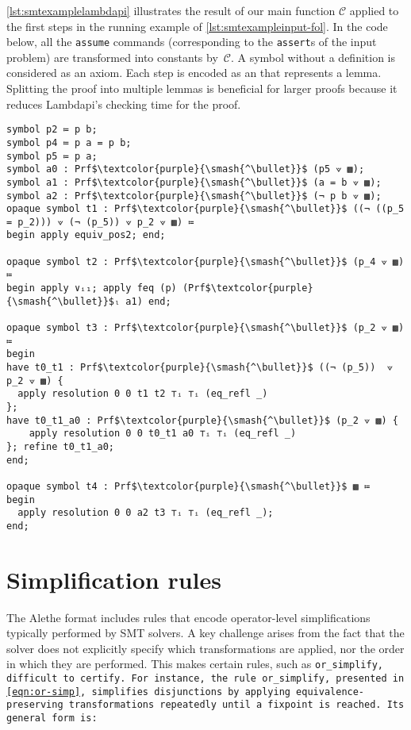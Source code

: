 \begin{example}
  \cref{lst:smtexamplelambdapi} illustrates the result of our main function $\mathcal{C}$ applied to the first steps in the running example of \cref{lst:smtexampleinput-fol}.
  In the code below, all the \texttt{assume} commands (corresponding to the \texttt{assert}s of the input problem) are transformed into constants by~$\mathcal{C}$. A symbol without a definition is considered as an axiom.
  Each step is encoded as an  that represents a lemma. Splitting the proof into multiple lemmas is beneficial for larger proofs because it reduces Lambdapi's checking time for the proof.
\end{example}

\begin{lstlisting}[mathescape=true, caption={Trace from \cref{lst:smtexampleinput} encoded in Lambdapi.}, label={lst:smtexamplelambdapi}, language=Lambdapi]
symbol p2 ≔ p b;
symbol p4 ≔ p a = p b;
symbol p5 ≔ p a;
symbol a0 : Prf$\textcolor{purple}{\smash{^\bullet}}$ (p5 ⟇ ▩);
symbol a1 : Prf$\textcolor{purple}{\smash{^\bullet}}$ (a = b ⟇ ▩);
symbol a2 : Prf$\textcolor{purple}{\smash{^\bullet}}$ (¬ p b ⟇ ▩);
opaque symbol t1 : Prf$\textcolor{purple}{\smash{^\bullet}}$ ((¬ ((p_5 = p_2))) ⟇ (¬ (p_5)) ⟇ p_2 ⟇ ▩) ≔
begin apply equiv_pos2; end;

opaque symbol t2 : Prf$\textcolor{purple}{\smash{^\bullet}}$ (p_4 ⟇ ▩) ≔
begin apply ∨ᵢ₁; apply feq (p) (Prf$\textcolor{purple}{\smash{^\bullet}}$ₗ a1) end;

opaque symbol t3 : Prf$\textcolor{purple}{\smash{^\bullet}}$ (p_2 ⟇ ▩) ≔
begin
have t0_t1 : Prf$\textcolor{purple}{\smash{^\bullet}}$ ((¬ (p_5))  ⟇ p_2 ⟇ ▩) {
  apply resolution 0 0 t1 t2 ⊤ᵢ ⊤ᵢ (eq_refl _)
};
have t0_t1_a0 : Prf$\textcolor{purple}{\smash{^\bullet}}$ (p_2 ⟇ ▩) {
    apply resolution 0 0 t0_t1 a0 ⊤ᵢ ⊤ᵢ (eq_refl _)
}; refine t0_t1_a0;
end;

opaque symbol t4 : Prf$\textcolor{purple}{\smash{^\bullet}}$ ▩ ≔
begin
  apply resolution 0 0 a2 t3 ⊤ᵢ ⊤ᵢ (eq_refl _);
end;
\end{lstlisting}

\section{Simplification rules}

The Alethe format includes rules that encode operator-level simplifications typically performed by SMT solvers. 
A key challenge arises from the fact that the solver does not explicitly specify which transformations are applied, nor the order in which they are performed. This makes certain rules, such as \tt{or\_simplify}, difficult to certify.
For instance, the rule \texttt{or\_simplify}, presented in \cref{eqn:or-simp}, simplifies disjunctions by applying equivalence-preserving transformations repeatedly until a fixpoint is reached. Its general form is:

